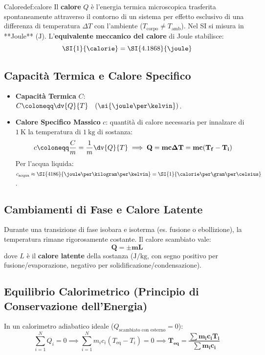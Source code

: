 \begin{definizione}{Calore}{def:calore}
Il \textbf{calore} $Q$ è l'energia termica microscopica trasferita spontaneamente attraverso il contorno di un sistema per effetto esclusivo di una differenza di temperatura $\Delta T$ con l'ambiente ($T_{\text{corpo}} \neq T_{\text{amb}}$).
Nel SI si misura in **Joule** ($\si{\joule}$). L'\textbf{equivalente meccanico del calore} di Joule stabilisce:
\begin{equation}
    \SI{1}{\calorie} = \SI{4.1868}{\joule}
\end{equation}
\end{definizione}

\subsection{Capacità Termica e Calore Specifico}
\begin{itemize}
    \item \textbf{Capacità Termica} $C$: $C \coloneqq \dv{Q}{T} \quad (\si{\joule\per\kelvin})$.
    \item \textbf{Calore Specifico Massico} $c$: quantità di calore necessaria per innalzare di $\SI{1}{\kelvin}$ la temperatura di $\SI{1}{\kilogram}$ di sostanza:
    \begin{equation}
        c \coloneqq \frac{C}{m} = \frac{1}{m}\dv{Q}{T} \implies \mathbf{Q = m c \Delta T = m c (T_f - T_i)}
        \label{eq:calore_sensibile}
    \end{equation}
    Per l'acqua liquida: $c_{\text{acqua}} \approx \SI{4186}{\joule\per\kilogram\per\kelvin} = \SI{1}{\calorie\per\gram\per\celsius}$.
\end{itemize}

\subsection{Cambiamenti di Fase e Calore Latente}
Durante una transizione di fase isobara e isoterma (es. fusione o ebollizione), la temperatura rimane rigorosamente costante. Il calore scambiato vale:
\begin{equation}
    \mathbf{Q = \pm m L}
    \label{eq:calore_latente}
\end{equation}
dove $L$ è il \textbf{calore latente} della sostanza ($\si{\joule\per\kilogram}$, con segno positivo per fusione/evaporazione, negativo per solidificazione/condensazione).

\subsection{Equilibrio Calorimetrico (Principio di Conservazione dell'Energia)}
In un calorimetro adiabatico ideale ($Q_{\text{scambiato con esterno}} = 0$):
\begin{equation}
    \sum_{i=1}^N Q_i = 0 \implies \sum_{i=1}^N m_i c_i (T_{\text{eq}} - T_i) = 0 \implies \mathbf{T_{\text{eq}} = \frac{\sum m_i c_i T_i}{\sum m_i c_i}}
    \label{eq:temperatura_equilibrio}
\end{equation}

